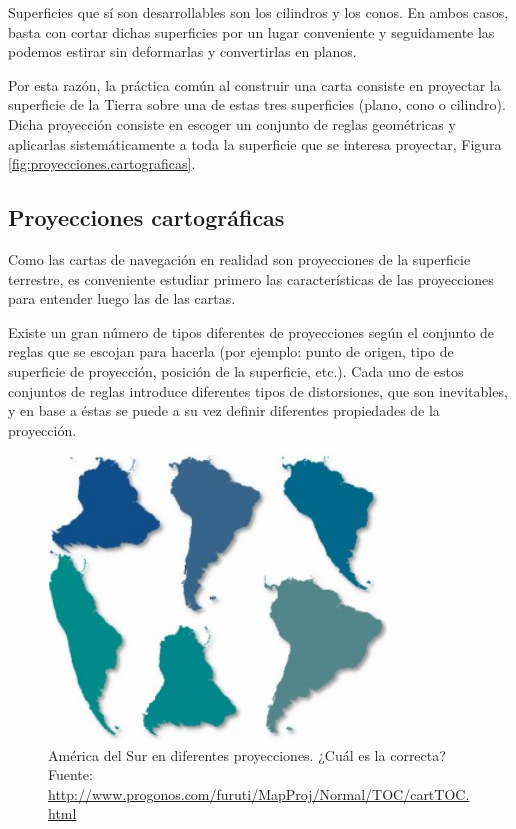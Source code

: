 Superficies que sí son desarrollables son los cilindros y los conos. En ambos casos, basta con cortar dichas superficies por un lugar conveniente y seguidamente las podemos estirar sin deformarlas y convertirlas en planos.

Por esta razón, la práctica común al construir una carta consiste en proyectar la superficie de la Tierra sobre una de estas tres superficies (plano, cono o cilindro). Dicha proyección consiste en escoger un conjunto de reglas geométricas y aplicarlas sistemáticamente a toda la superficie que se interesa proyectar, Figura \ref{fig:proyecciones.cartograficas}.

\subsection{Proyecciones cartogr\'aficas}
\label{sec:proyecciones.cartograficas}

Como las cartas de navegación en realidad son proyecciones de la superficie terrestre, es conveniente estudiar primero las características de las proyecciones para entender luego las de las cartas. 

 Existe un gran número de tipos diferentes de proyecciones según el conjunto de reglas que se escojan para hacerla (por ejemplo: punto de origen, tipo de superficie de proyección, posición de la superficie, etc.). Cada uno de estos conjuntos de reglas introduce diferentes tipos de distorsiones, que son inevitables, y en base a éstas se puede a su vez definir diferentes propiedades de la proyección.

\begin{figure}[!h]
  \centering
  \includegraphics[width=0.8\textwidth]{./Imagenes/06.00.navegacion/comparacion-proyecciones.jpg}
  \caption{Am\'erica del Sur en diferentes proyecciones. ¿Cu\'al es la correcta? \\{\footnotesize Fuente: \url{http://www.progonos.com/furuti/MapProj/Normal/TOC/cartTOC.html}}}
  \label{fig:comparacion.proyecciones.cartograficas}
\end{figure}


